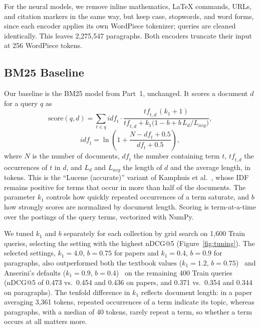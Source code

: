 \documentclass[sigconf,nonacm]{acmart}
\begin{document}
For the neural models, we remove inline mathematics, \LaTeX{} commands, URLs, and
citation markers in the same way, but keep case, stopwords, and word forms, since
each encoder applies its own WordPiece tokenizer; queries are cleaned identically.
This leaves 2,275,547 paragraphs. Both encoders truncate their input at 256 WordPiece tokens.

\subsection{BM25 Baseline}
\label{sec:bm25}
Our baseline is the BM25 model from Part~1, unchanged. It scores a document 
$d$ for a query $q$ as 
\begin{equation}
  \mathrm{score}(q,d) = \sum_{t \in q} \mathit{idf}_t \cdot
    \frac{\mathit{tf}_{t,d}\,(k_1 + 1)}
         {\mathit{tf}_{t,d} + k_1 \bigl(1 - b + b\,L_d / L_{\mathit{avg}}\bigr)},
  \label{eq:bm25}
\end{equation}
\begin{equation}
  \mathit{idf}_t = \ln\!\left(1 + \frac{N - \mathit{df}_t + 0.5}{\mathit{df}_t + 0.5}\right),
  \label{eq:idf}
\end{equation}
where $N$ is the number of documents, $\mathit{df}_t$ the number containing term 
$t$, $\mathit{tf}_{t,d}$ the occurrences of $t$ in $d$, and $L_d$ and $L_{\mathit{avg}}$ 
the length of $d$ and the average length, in tokens. This is the ``Lucene (accurate)'' 
variant of Kamphuis et al.~\cite{kamphuis2020bm25}, whose IDF remains positive for 
terms that occur in more than half of the documents. The parameter $k_1$ controls how 
quickly repeated occurrences of a term saturate, and $b$ how strongly scores are 
normalized by document length. Scoring is term-at-a-time over the postings of the query 
terms, vectorized with NumPy.

We tuned $k_1$ and $b$ separately for each collection by grid search on 1,600 Train 
queries, selecting the setting with the highest nDCG@5 (Figure~\ref{fig:tuning}). The 
selected settings, $k_1 = 4.0$, $b = 0.75$ for papers and $k_1 = 0.4$, $b = 0.9$ for 
paragraphs, also outperformed both the textbook values ($k_1 = 1.2$, $b = 0.75$)~\cite{manning2008irbook} 
and Anserini's defaults ($k_1 = 0.9$, $b = 0.4$)~\cite{yang2017anserini} on the remaining 
400 Train queries (nDCG@5 of 0.473 vs.\ 0.454 and 0.436 on papers, and 0.371 vs.\ 0.354 
and 0.344 on paragraphs). The tenfold difference in $k_1$ reflects document length: 
in a paper averaging 3,361 tokens, repeated occurrences of a term indicate its topic, 
whereas paragraphs, with a median of 40 tokens, rarely repeat a term, so whether a 
term occurs at all matters more.
\end{document}
